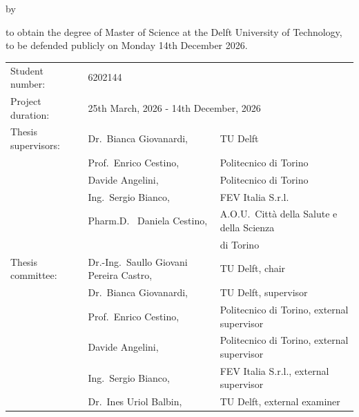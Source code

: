 \begin{titlepage}

\begin{center}

{\makeatletter
\covertitlestyle\fontsize{30}{30}\selectfont\@title
\makeatother}

{\makeatletter
\ifdefvoid{\@subtitle}{}{\bigskip\coversubtitlestyle\fontsize{20}{20}\selectfont\@subtitle}
\makeatother}

\bigskip
\bigskip

by

\bigskip
\bigskip

{\makeatletter
\coversubtitlestyle\fontsize{25}{25}\selectfont\@author
\makeatother}

\bigskip
\bigskip

to obtain the degree of Master of Science at the Delft University of Technology, \\
to be defended publicly on Monday 14th December 2026.


\vfill

\begin{tabular}{lll}
    Student number: & 6202144 \\
    Project duration: & \multicolumn{2}{l}{25th March, 2026 - 14th December, 2026} \\
    Thesis supervisors: & Dr.\ Bianca Giovanardi, & TU Delft \\
        & Prof.\ Enrico Cestino, & Politecnico di Torino \\
        & Davide Angelini, & Politecnico di Torino \\
        & Ing.\ Sergio Bianco, & FEV Italia S.r.l. \\
        & Pharm.D. \ Daniela Cestino, & A.O.U.\ Città della Salute e della Scienza \\
        & & di Torino \\[1ex]
    Thesis committee: & Dr.-Ing.\ Saullo Giovani Pereira Castro, & TU Delft, chair \\
        & Dr.\ Bianca Giovanardi, & TU Delft, supervisor \\
        & Prof.\ Enrico Cestino, & Politecnico di Torino, external supervisor \\
        & Davide Angelini, & Politecnico di Torino, external supervisor \\
        & Ing.\ Sergio Bianco, & FEV Italia S.r.l., external supervisor \\
        & Dr.\ Ines Uriol Balbin, & TU Delft, external examiner
\end{tabular}


\end{center}
\end{titlepage}
